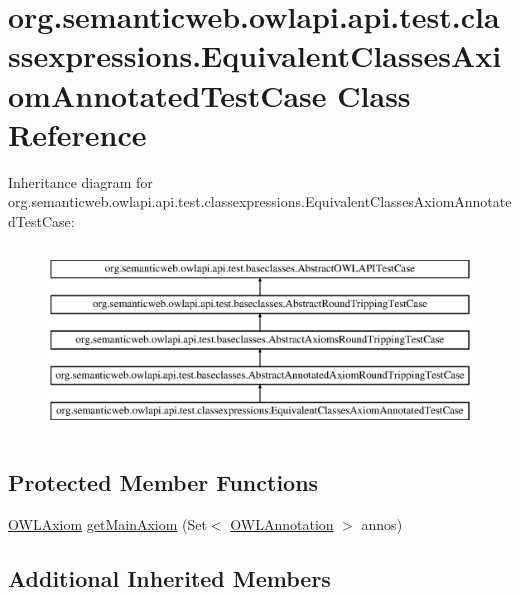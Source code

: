 \hypertarget{classorg_1_1semanticweb_1_1owlapi_1_1api_1_1test_1_1classexpressions_1_1_equivalent_classes_axiom_annotated_test_case}{\section{org.\-semanticweb.\-owlapi.\-api.\-test.\-classexpressions.\-Equivalent\-Classes\-Axiom\-Annotated\-Test\-Case Class Reference}
\label{classorg_1_1semanticweb_1_1owlapi_1_1api_1_1test_1_1classexpressions_1_1_equivalent_classes_axiom_annotated_test_case}
}
Inheritance diagram for org.\-semanticweb.\-owlapi.\-api.\-test.\-classexpressions.\-Equivalent\-Classes\-Axiom\-Annotated\-Test\-Case\-:\begin{figure}[H]
\begin{center}
\leavevmode
\includegraphics[height=5.000000cm]{classorg_1_1semanticweb_1_1owlapi_1_1api_1_1test_1_1classexpressions_1_1_equivalent_classes_axiom_annotated_test_case}
\end{center}
\end{figure}
\subsection*{Protected Member Functions}
\begin{DoxyCompactItemize}
\item 
\hyperlink{interfaceorg_1_1semanticweb_1_1owlapi_1_1model_1_1_o_w_l_axiom}{O\-W\-L\-Axiom} \hyperlink{classorg_1_1semanticweb_1_1owlapi_1_1api_1_1test_1_1classexpressions_1_1_equivalent_classes_axiom_annotated_test_case_ad1e578eddb09dd99201d8fbe995cee84}{get\-Main\-Axiom} (Set$<$ \hyperlink{interfaceorg_1_1semanticweb_1_1owlapi_1_1model_1_1_o_w_l_annotation}{O\-W\-L\-Annotation} $>$ annos)
\end{DoxyCompactItemize}
\subsection*{Additional Inherited Members}


